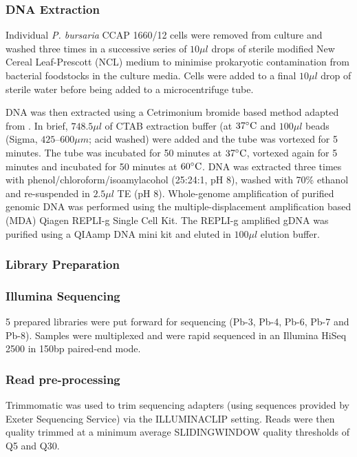 \subsubsection{DNA Extraction}

Individual \textit{P. bursaria} CCAP 1660/12 cells were removed from culture 
and washed three times in a successive series of 
\(10 \mu l\) drops of sterile modified 
New Cereal Leaf-Prescott (NCL) medium to minimise prokaryotic contamination from 
bacterial foodstocks in the culture media. 
Cells were added to a final \(10\mu l\) drop of sterile water before being added
to a microcentrifuge tube.

DNA was then extracted using a Cetrimonium bromide based method adapted from \citep{Winnepenninckx1993}. 
In brief,  \(748.5 \mu l\) of CTAB extraction buffer (at \(37\celsius\) and \(100 \mu l\) beads (Sigma, \(425 – 600 \mu m\); acid washed) 
were added and the tube was vortexed for 5 minutes. 
The tube was incubated for 50 minutes at \(37\celsius\), 
vortexed again for 5 minutes and incubated for 50 minutes at \(60\celsius\). 
DNA was extracted three times with phenol/chloroform/isoamylacohol (25:24:1, pH 8), washed with 70\% ethanol and 
re-suspended in \(2.5 \mu l\) TE (pH 8). 
Whole-genome amplification of purified genomic DNA was performed using the multiple-displacement amplification based
(MDA) Qiagen REPLI-g Single Cell Kit. 
The REPLI-g amplified gDNA was purified using a QIAamp DNA mini kit and eluted in \(100 \mu l\) elution buffer.

\subsubsection{Library Preparation}


\subsubsection{Illumina Sequencing}

5 prepared libraries were put forward for sequencing 
(Pb-3, Pb-4, Pb-6, Pb-7 and Pb-8).   Samples were
multiplexed and were rapid sequenced in an Illumina
HiSeq 2500 in 150bp paired-end mode. 

\subsubsection{Read pre-processing}

Trimmomatic \citep{Bolger2014a} was used to trim sequencing adapters (using sequences
provided by Exeter Sequencing Service) via the ILLUMINACLIP setting.
Reads were then quality trimmed at a minimum average SLIDINGWINDOW 
quality thresholds of Q5 and Q30. 

